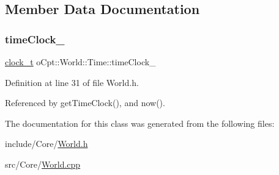 \subsection{Member Data Documentation}
\hypertarget{classo_cpt_1_1_world_1_1_time_a219308dd501f332e4d49f30ad4e5206e}{}\label{classo_cpt_1_1_world_1_1_time_a219308dd501f332e4d49f30ad4e5206e} 
\subsubsection{\texorpdfstring{time\+Clock\+\_\+}{timeClock\_}}
{\footnotesize\ttfamily \hyperlink{classo_cpt_1_1_world_1_1_time_ac41de01610f32d0ace4844ed3bf454f7}{clock\+\_\+t} o\+Cpt\+::\+World\+::\+Time\+::time\+Clock\+\_\+\hspace{0.3cm}{\ttfamily [private]}}



Definition at line 31 of file World.\+h.



Referenced by get\+Time\+Clock(), and now().



The documentation for this class was generated from the following files\+:\begin{DoxyCompactItemize}
\item 
include/\+Core/\hyperlink{_world_8h}{World.\+h}\item 
src/\+Core/\hyperlink{_world_8cpp}{World.\+cpp}\end{DoxyCompactItemize}
